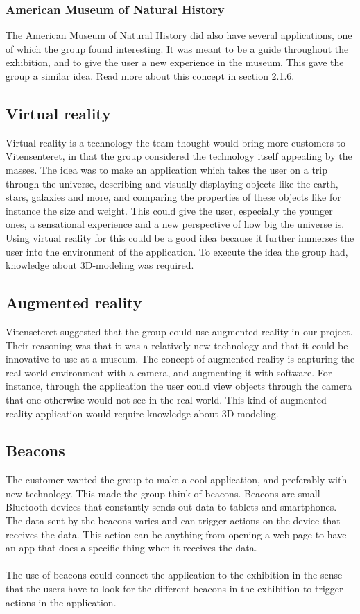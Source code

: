 \subsubsection{American Museum of Natural History}
The American Museum of Natural History\cite{amnh} did also have several applications, one of which the group found interesting. It was meant to be a guide throughout the exhibition, and to give the user a new experience in the museum\cite{amnh1}. This gave the group a similar idea. Read more about this concept in section 2.1.6.

\subsection{Virtual reality}
Virtual reality is a technology the team thought would bring more customers to Vitensenteret, in that the group considered the technology itself  appealing by the masses. The idea was to make an application which takes the user on a trip through the universe, describing and visually displaying objects like the earth, stars, galaxies and more, and comparing the properties of these objects like for instance the size and weight. This could give the user, especially the younger ones, a sensational experience and a new perspective of how big the universe is. Using virtual reality for this could be a good idea because it further immerses the user into the environment of the application. To execute the idea the group had, knowledge about 3D-modeling was required\cite{virtualreality}. 

\subsection{Augmented reality}
Vitenseteret suggested that the group could use augmented reality in our project. Their reasoning was that it was a relatively new technology and that it could be innovative to use at a museum. The concept of augmented reality is capturing the real-world environment with a camera, and augmenting it with software. For instance, through the application the user could view objects through the camera that one otherwise would not see in the real world. This kind of augmented reality application would require knowledge about 3D-modeling.

\subsection{Beacons}
The customer wanted the group to make a cool application, and preferably with new technology. This made the group think of beacons. Beacons are small Bluetooth-devices that constantly sends out data to tablets and smartphones. The data sent by the beacons varies and can trigger actions on the device that receives the data. This action can be anything from opening a web page to have an app that does a specific thing when it receives the data\cite{whatisbeacon1}\cite{whatisbeacon2}.\\
\\
The use of beacons could connect the application to the exhibition in the sense that the users have to look for the different beacons in the exhibition to trigger actions in the application.

